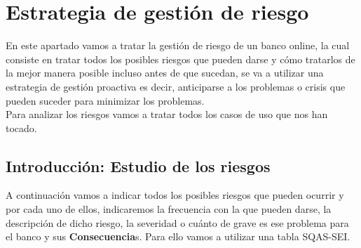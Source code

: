 \section{Estrategia de gestión de riesgo}
En este apartado vamos a tratar la gestión de riesgo de un banco online, la cual consiste en tratar todos los posibles riesgos que pueden darse y cómo tratarlos de la mejor manera posible incluso antes de que sucedan,  se va a utilizar una estrategia de gestión proactiva es decir, anticiparse a los problemas o crisis que pueden suceder para minimizar los problemas.\\
Para analizar los riesgos vamos a tratar todos los casos de uso que nos han tocado.

\subsection{Introducción: Estudio de los riesgos}
A continuación vamos a indicar todos los posibles riesgos que pueden ocurrir y por cada uno de ellos, indicaremos la frecuencia con la que pueden darse, la descripción de dicho riesgo, la severidad o cuánto de grave es ese problema para el banco y sus \textbf{Consecuencia}s.
Para ello vamos a utilizar una tabla SQAS-SEI.
